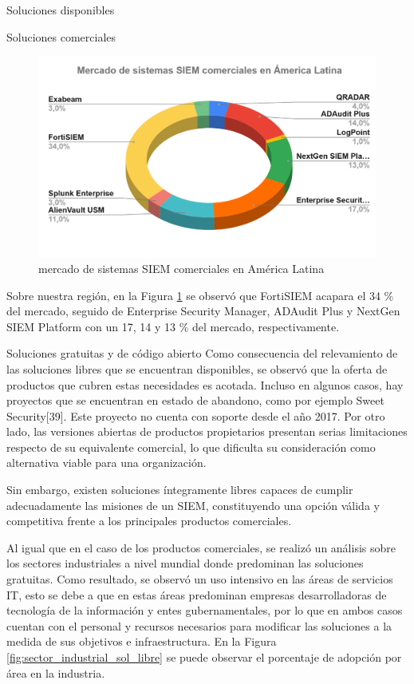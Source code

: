 \begin{section}{Soluciones disponibles}
\begin{subsection}{Soluciones comerciales}
        \begin{figure}[H]
            \centering
            \includegraphics[width=1\textwidth]{./marco_teorico_imagenes/figura_12_comercial_america_latina.png}
            \caption{mercado de sistemas SIEM comerciales en América Latina}
            \label{fig:comercial_latam}
        \end{figure}
        \FloatBarrier
        Sobre nuestra región, en la Figura \ref{fig:comercial_latam} se observó que FortiSIEM acapara el 34 \% del mercado, seguido de Enterprise Security Manager, ADAudit Plus y NextGen SIEM Platform con un 17, 14 y 13 \% del mercado, respectivamente.
        \end{subsection}
        
        \begin{subsection}{Soluciones gratuitas y de código abierto}
        Como consecuencia del relevamiento de las soluciones libres que se encuentran disponibles, se observó que la oferta de productos que cubren estas necesidades es acotada. Incluso en algunos casos, hay proyectos que se encuentran en estado de abandono, como por ejemplo Sweet Security[39]. Este proyecto no cuenta con soporte desde el año 2017. Por otro lado, las versiones abiertas de productos propietarios presentan serias limitaciones respecto de su equivalente comercial, lo que dificulta su consideración como alternativa viable para una organización. \par
        Sin embargo, existen soluciones íntegramente libres capaces de cumplir adecuadamente las misiones de un SIEM, constituyendo una opción válida y competitiva frente a los principales productos comerciales.\par
        Al igual que en el caso de los productos comerciales, se realizó un análisis sobre los sectores industriales a nivel mundial donde predominan las soluciones gratuitas. Como resultado, se observó un uso intensivo en las áreas de servicios IT, esto se debe a que en estas áreas predominan empresas desarrolladoras de tecnología de la información y entes gubernamentales, por lo que en ambos casos cuentan con el personal y recursos necesarios para modificar las soluciones a la medida de sus objetivos e infraestructura. En la Figura \ref{fig:sector_industrial_sol_libre} se puede observar el porcentaje de adopción por área en la industria.\par
        

\end{subsection}
\end{section}
